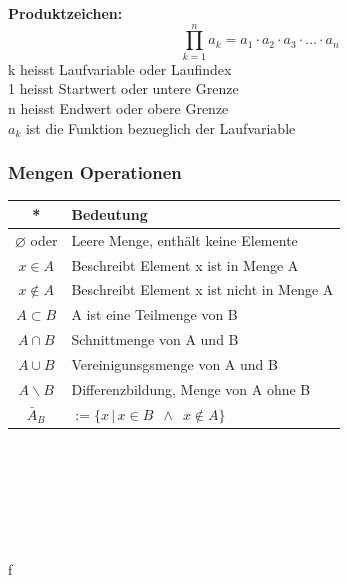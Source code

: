 \begin{multicols}{2}
    \textbf{Produktzeichen:}
    \[ \prod_{k=1}^{n} a_k = a_1 \cdot a_2 \cdot a_3 \cdot \ldots \cdot a_n\]
    k heisst Laufvariable oder Laufindex \\
    1 heisst Startwert oder untere Grenze \\
    n heisst Endwert oder obere Grenze \\
    $a_{k}$ ist die Funktion bezueglich der Laufvariable \\

    \subsubsection{Mengen Operationen}

    \begin{tabularx}{0.5\textwidth} {
            | >{\raggedright\arraybackslash}c
            | >{\raggedright\arraybackslash}X |}
        \hline
        \textbf{*}            & \textbf{Bedeutung}                                           \\ \hline
        $\varnothing$ oder {} & Leere Menge, enthält keine Elemente                          \\ \hline
        $x\in A$              & Beschreibt Element x ist in Menge A                          \\ \hline
        $x\notin A$           & Beschreibt Element x ist nicht in Menge A                    \\ \hline
        $A\subset B$          & A ist eine Teilmenge von B                                   \\ \hline
        $A\cap B$             & Schnittmenge von A und B                                     \\ \hline
        $A\cup B$             & Vereinigunsgsmenge von A und B                               \\ \hline
        $A\backslash B$       & Differenzbildung, Menge von A ohne B                         \\\hline
        $\bar{A}_B$           & $:= \{x \,|\, x \in B \enspace \wedge \enspace x \notin A\}$ \\\hline
    \end{tabularx}
    \\~\\
    \\~\\
    \\~\\
    f
    \def\firstcircle{(0,0) circle (1cm)}
    \def\secondcircle{(0:1.2cm) circle (1cm)}


\end{multicols}

